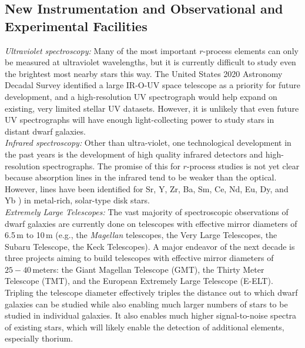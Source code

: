 \documentclass[letterpaper]{article}
\begin{document}
\subsection{New Instrumentation and Observational and Experimental Facilities}

\textit{Ultraviolet spectroscopy:}
Many of the most important $r$-process elements can only be measured at ultraviolet wavelengths, but it is currently difficult to study even the brightest most nearby stars \citep{Roederer2012,Roederer2022} this way. The United States 2020 Astronomy Decadal Survey identified a large IR-O-UV space telescope as a priority for future development, and a high-resolution UV spectrograph would help expand on existing, very limited stellar UV datasets. However, it is unlikely that even future UV spectrographs will have enough light-collecting power to study stars in distant dwarf galaxies.\\

\textit{Infrared spectroscopy:}
Other than ultra-violet, one technological development in the past years is the development of high quality infrared detectors and high-resolution spectrographs. The promise of this for $r$-process studies is not yet clear because absorption lines in the infrared tend to be weaker than the optical. However, lines have been identified for Sr, Y, Zr, Ba, Sm, Ce, Nd, Eu, Dy, and Yb \citep{Matsunaga2020,Smith2021}) in metal-rich, solar-type disk stars.
\\

\textit{Extremely Large Telescopes:}
The vast majority of spectroscopic observations of dwarf galaxies are currently done on telescopes with effective mirror diameters of 6.5\,m to 10\,m (e.g., the \textit{Magellan} telescopes, the Very Large Telescopes, the Subaru Telescope, the Keck Telescopes).
A major endeavor of the next decade is three projects aiming to build telescopes with effective mirror diameters of $25-40$\,meters: the Giant Magellan Telescope (GMT), the Thirty Meter Telescope (TMT), and the European Extremely Large Telescope (E-ELT).
Tripling the telescope diameter effectively triples the distance out to which dwarf galaxies can be studied while also enabling much larger numbers of stars to be studied in individual galaxies.
It also enables much higher signal-to-noise spectra of existing stars, which will likely enable the detection of additional elements, especially thorium.\\
\end{document}
